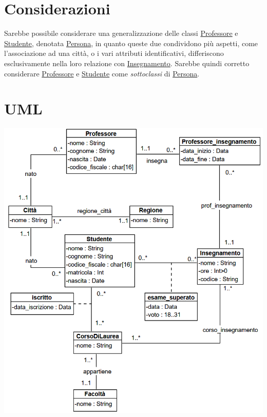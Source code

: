 \documentclass[12pt, letterpaper]{article}
\begin{document}
\section{Considerazioni}
Sarebbe possibile considerare una generalizzazione delle classi  \underline{Professore} e  \underline{Studente}, denotata 
\underline{Persona}, in quanto queste due condividono più aspetti, come l'associazione ad una città, o i vari attributi identificativi,
differiscono esclusivamente nella loro relazione con \underline{Insegnamento}. Sarebbe quindi corretto considerare 
\underline{Professore} e  \underline{Studente} come \textit{sottoclassi} di \underline{Persona}.

\section{UML}
\includegraphics[width=\textwidth]{images/UML.png}
\end{document}
